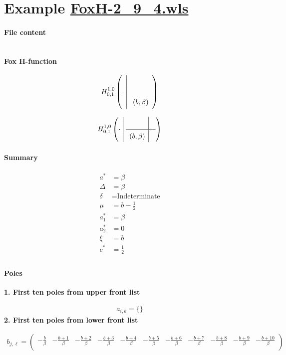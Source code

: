 \documentclass[11pt]{article}
\begin{document}
\section{Example \url{FoxH-2_9_4.wls}}

\paragraph{File content}

\inputminted{text}{FoxH-2_9_4.wls}

\paragraph{Fox H-function}

\begin{align*}
  \FoxH
    {1,0}
    {0,1}
    {\cdot}
    {}
    {\left(b, \beta\right)}
\end{align*}

\begin{align*}
  \FoxHext
    {1,0}
    {0,1}
    {\cdot}
    {}
    {}
    {\left(b, \beta\right)}
    {}
\end{align*}

\paragraph{Summary}

\begin{align*}
  a^*    & = \beta \\
  \Delta & = \beta \\
  \delta & = \text{Indeterminate} \\
  \mu    & = b-\frac{1}{2} \\
  a_1^*  & = \beta \\
  a_2^*  & = 0 \\
  \xi    & = b \\
  c^*    & = \frac{1}{2} \\
\end{align*}

\paragraph{Poles}

\noindent\textbf{1. First ten poles from upper front list}

\begin{align*}
  a_{i,k} = 
  \{\}
\end{align*}
\noindent\textbf{2. First ten poles from lower front list}

\begin{align*}
  b_{j,\ell} = 
  \left(
\begin{array}{ccccccccccc}
 -\frac{b}{\beta } & -\frac{b+1}{\beta } & -\frac{b+2}{\beta } & -\frac{b+3}{\beta } & -\frac{b+4}{\beta } & -\frac{b+5}{\beta } & -\frac{b+6}{\beta } & -\frac{b+7}{\beta } & -\frac{b+8}{\beta } & -\frac{b+9}{\beta } & -\frac{b+10}{\beta } \\
\end{array}
\right)
\end{align*}



\printbibliography[title={References}]
\end{document}
